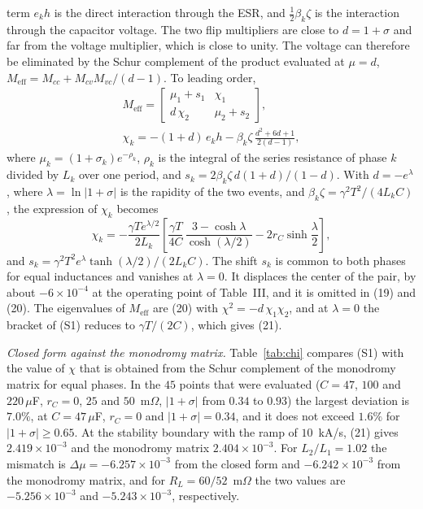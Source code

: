 \documentclass[journal]{IEEEtran}
\begin{document}
term $e_kh$ is the direct interaction through the ESR, and
$\tfrac12\beta_k\zeta$ is the interaction through the capacitor voltage. The
two flip multipliers are close to $d=1+\sigma$ and far from the voltage
multiplier, which is close to unity. The voltage can therefore be eliminated
by the Schur complement of the product evaluated at $\mu=d$,
$M_{\mathrm{eff}}=M_{cc}+M_{cv}M_{vc}/(d-1)$. To leading order,
\begin{equation*}
\begin{gathered}
M_{\mathrm{eff}}=\begin{bmatrix}\mu_1+s_1&\chi_1\\d\,\chi_2&\mu_2+s_2\end{bmatrix},\\
\chi_k=-(1+d)\,e_kh-\beta_k\zeta\,\frac{d^{2}+6d+1}{2(d-1)},
\end{gathered}
\end{equation*}
where $\mu_k=(1+\sigma_k)e^{-\rho_k}$, $\rho_k$ is the integral of the series
resistance of phase $k$ divided by $L_k$ over one period, and
$s_k=2\beta_k\zeta\,d(1+d)/(1-d)$. With $d=-e^{\lambda}$, where $\lambda=\ln\lvert1+\sigma\rvert$ is the rapidity
of the two events, and $\beta_k\zeta=\gamma^{2}T^{2}/(4L_kC)$, the expression
of $\chi_k$ becomes
\begin{equation}
\chi_k=-\frac{\gamma Te^{\lambda/2}}{2L_k}\left[\frac{\gamma T}{4C}\,
\frac{3-\cosh\lambda}{\cosh(\lambda/2)}-2r_C\sinh\frac{\lambda}{2}\right],
\tag{S1}
\end{equation}
and $s_k=\gamma^{2}T^{2}e^{\lambda}\tanh(\lambda/2)/(2L_kC)$. The shift
$s_k$ is common to both phases for equal inductances and vanishes at
$\lambda=0$. It displaces the center of the pair, by about $-6\times10^{-4}$ at
the operating point of Table~III, and it is omitted in (19) and (20). The
eigenvalues of $M_{\mathrm{eff}}$ are (20) with $\chi^{2}=-d\,\chi_1\chi_2$,
and at $\lambda=0$ the bracket of (S1) reduces to $\gamma T/(2C)$, which
gives (21).

\emph{Closed form against the monodromy matrix.} Table~\ref{tab:chi}
compares (S1) with the value of $\chi$ that is obtained from the Schur
complement of the monodromy matrix for equal phases. In the $45$ points that
were evaluated ($C=47$, $100$ and $220\,\mu$F, $r_C=0$, $25$ and
$50$~m$\Omega$, $\lvert1+\sigma\rvert$ from $0.34$ to $0.93$) the largest
deviation is $7.0\%$, at $C=47\,\mu$F, $r_C=0$ and $\lvert1+\sigma\rvert=0.34$,
and it does not exceed $1.6\%$ for $\lvert1+\sigma\rvert\ge0.65$. At the stability
boundary with the ramp of $10$~kA/s, (21) gives $2.419\times10^{-3}$ and the
monodromy matrix $2.404\times10^{-3}$. For $L_2/L_1=1.02$ the mismatch is
$\Delta\mu=-6.257\times10^{-3}$ from the closed form and
$-6.242\times10^{-3}$ from the monodromy matrix, and for
$R_L=60/52$~m$\Omega$ the two values are $-5.256\times10^{-3}$ and
$-5.243\times10^{-3}$, respectively.
\end{document}
